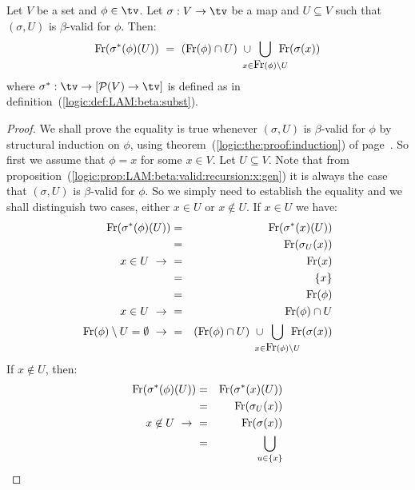 \begin{prop}\label{logic:prop:LAM:freevar:of:betasubst:valid:gen}
    Let $V$ be a set and $\phi\in\tv$. Let $\sigma:V\to\tv$ be a map and
    $U\subseteq V$ such that $(\sigma,U)$ is $\beta$-valid for $\phi$. Then: 
    \[
        \free(\sigma^{*}(\phi)(U)) 
            \ =\ 
        (\free(\phi)\cap U)
        \ \cup
        \!\!\!\!\!\!
        \bigcup_{x\in\free(\phi)\setminus U} 
        \!\!\!\!\!\!
        \free(\sigma(x))
    \]
    where $\sigma^{*}:\tv\to[{\cal P}(V)\to\tv]$ is defined as in 
    definition~(\ref{logic:def:LAM:beta:subst}).
\end{prop}
\begin{proof}
    We shall prove the equality is true whenever $(\sigma,U)$ is $\beta$-valid
    for $\phi$ by structural induction on $\phi$, using
    theorem~(\ref{logic:the:proof:induction}) of 
    page~\pageref{logic:the:proof:induction}. So first we assume that $\phi=x$ 
    for some $x\in V$. Let $U\subseteq V$. Note that from
    proposition~(\ref{logic:prop:LAM:beta:valid:recursion:x:gen}) it is 
    always the case that $(\sigma,U)$ is $\beta$-valid for $\phi$. So 
    we simply need to establish the equality and we shall distinguish
    two cases, either $x\in U$ or $x\not\in U$. If $x\in U$ we have:
    \begin{eqnarray*}
        \free(\sigma^{*}(\phi)(U))
        &=&\free(\sigma^{*}(x)(U))\\
        &=&\free(\sigma_{U}(x))\\
        \mbox{$x\in U\ \rightarrow\ $}&=&\free(x)\\
         &=&\{x\}\\
         &=&\free(\phi)\\
        \mbox{$x\in U\ \rightarrow\ $}&=&\free(\phi)\cap U\\
        \mbox{$\free(\phi)\setminus U = \emptyset\ \rightarrow\ $} &=& 
            (\free(\phi)\cap U)
            \ \cup
            \!\!\!\!\!\!
            \bigcup_{x\in\free(\phi)\setminus U} 
            \!\!\!\!\!\!
            \free(\sigma(x))
    \end{eqnarray*}
    If $x\not\in U$, then:
    \begin{eqnarray*}
        \free(\sigma^{*}(\phi)(U))
        &=&\free(\sigma^{*}(x)(U))\\
        &=&\free(\sigma_{U}(x))\\
        \mbox{$x\not\in U\ \rightarrow\ $}&=&\free(\sigma(x))\\
        &=&
        \!\!\!
        \bigcup_{u\in\{x\}} 

\end{eqnarray*}
\end{proof}
